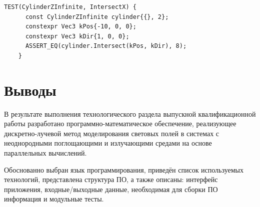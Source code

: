 \begin{lstlisting}[gobble=8, language=C++23, caption={Юнит-тест метода пересечения луча с поверхностью цилиндра\label{lst:cpp-unit-tests-intersection}}]
	TEST(CylinderZInfinite, IntersectX) {
	  const CylinderZInfinite cylinder{{}, 2};
	  constexpr Vec3 kPos{-10, 0, 0};
	  constexpr Vec3 kDir{1, 0, 0};
	  ASSERT_EQ(cylinder.Intersect(kPos, kDir), 8);
	}
\end{lstlisting}

\section*{Выводы}

В результате выполнения технологического раздела выпускной квалификационной работы разработано программно-математическое обеспечение, реализующее дискретно-лучевой метод моделирования световых полей в системах с неоднородными поглощающими и излучающими средами на основе параллельных вычислений.

Обоснованно выбран язык программирования, приведён список используемых технологий, представлена структура ПО, а также описаны: интерфейс приложения, входные/выходные данные, необходимая для сборки ПО информация и модульные тесты.
